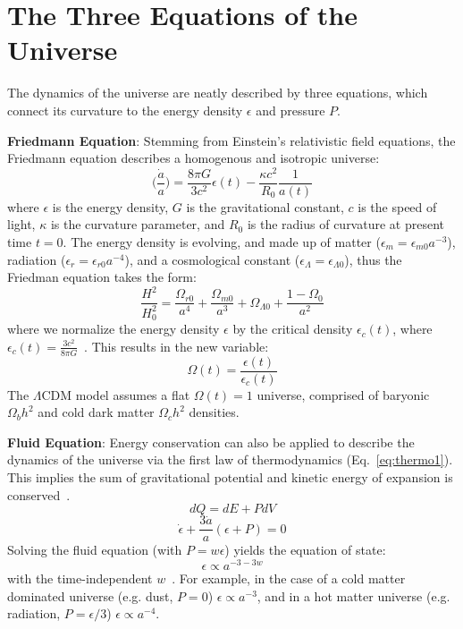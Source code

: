 \section{The Three Equations of the Universe}

The dynamics of the universe are neatly described by three equations, which connect its curvature to the energy density $\epsilon$ and pressure $P$.

\noindent
\textbf{Friedmann Equation}:  Stemming from Einstein's relativistic field equations, the Friedmann equation describes a homogenous and isotropic universe:  
\begin{equation}
    \bigg ( \frac{\Dot{a}}{a} \bigg ) = \frac{8\pi G}{3c^2}\epsilon(t) - \frac{\kappa c^2}{R_0}\frac{1}{a(t)}
\end{equation}
where $\epsilon$ is the energy density, $G$ is the gravitational constant, $c$ is the speed of light, $\kappa$ is the curvature parameter, and $R_0$ is the radius of curvature at present time $t=0$.  The energy density is evolving, and made up of matter ($\epsilon_m=\epsilon_{m0}a^{-3}$), radiation ($\epsilon_r=\epsilon_{r0}a^{-4}$), and a cosmological constant ($\epsilon_{\Lambda}=\epsilon_{\Lambda 0}$), thus the Friedman equation takes the form:
\begin{equation}
    \frac{H^2}{H_0^2} = \frac{\Omega_{r0}}{a^4} + \frac{\Omega_{m0}}{a^3} + \Omega_{\Lambda 0} + \frac{1-\Omega_0}{a^2}
\end{equation}
where we normalize the energy density $\epsilon$ by the critical density $\epsilon_c(t)$, where $\epsilon_c(t) = \frac{3c^2}{8\pi G}$~\cite{ryden_2016}.  This results in the new variable:
\begin{equation}
    \Omega(t) = \frac{\epsilon(t)}{\epsilon_c(t)}
\end{equation}
The $\Lambda$CDM model assumes a flat $\Omega(t)=1$ universe, comprised of baryonic $\Omega_b h^2$ and cold dark matter $\Omega_c h^2$ densities.

\noindent
\textbf{Fluid Equation}:  Energy conservation can also be applied to describe the dynamics of the universe via the first law of thermodynamics (Eq.~\ref{eq:thermo1}).  This implies the sum of gravitational potential and kinetic energy of expansion is conserved~\cite{ryden_2016}.
\begin{equation}
    dQ = dE + PdV
    \label{eq:thermo1}
\end{equation}
\begin{equation}
    \dot{\epsilon} + \frac{3\dot{a}}{a}(\epsilon + P) = 0
    \label{eq:fluid_universe}
\end{equation}
\noindent
Solving the fluid equation (with $P=w\epsilon$) yields the equation of state:
\begin{equation}
    \epsilon \propto a^{-3-3w}
\end{equation}
with the time-independent $w$~\cite{weinberg_cosmo}.  For example, in the case of a cold matter dominated universe (e.g. dust, $P = 0$) $\epsilon\propto a^{-3}$, and in a hot matter universe (e.g. radiation, $P=\epsilon/3$) $\epsilon\propto a^{-4}$.

